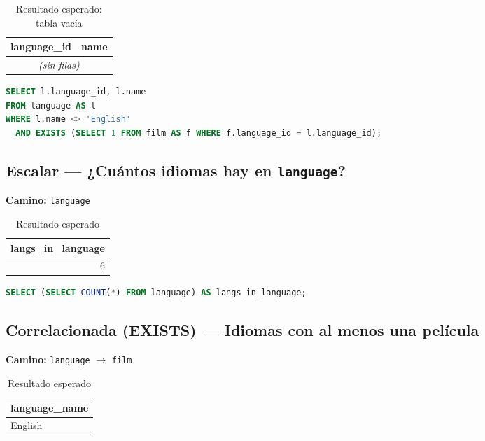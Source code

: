 \documentclass[12pt,a4paper]{article}
\begin{document}
\begin{table}[h]
\centering
\caption{Resultado esperado: tabla vacía}
\begin{tabular}{@{}r l@{}}
\toprule
\textbf{language\_id} & \textbf{name} \\
\midrule
\multicolumn{2}{c}{\emph{(sin filas)}} \\
\bottomrule
\end{tabular}
\end{table}

\begin{lstlisting}[language=SQL]
SELECT l.language_id, l.name
FROM language AS l
WHERE l.name <> 'English'
  AND EXISTS (SELECT 1 FROM film AS f WHERE f.language_id = l.language_id);
\end{lstlisting}

\subsection{Escalar — ¿Cuántos idiomas hay en \texttt{language}?}
\textbf{Camino:} \texttt{language}

\begin{table}[h]
\centering
\caption{Resultado esperado}
\begin{tabular}{@{}r@{}}
\toprule
\textbf{langs\_in\_language} \\
\midrule
6 \\
\bottomrule
\end{tabular}
\end{table}

\begin{lstlisting}[language=SQL]
SELECT (SELECT COUNT(*) FROM language) AS langs_in_language;
\end{lstlisting}

\subsection{Correlacionada (EXISTS) — Idiomas con al menos una película}
\textbf{Camino:} \texttt{language} $\rightarrow$ \texttt{film}

\begin{table}[h]
\centering
\caption{Resultado esperado}
\begin{tabular}{@{}l@{}}
\toprule
\textbf{language\_name} \\
\midrule
English \\
\bottomrule
\end{tabular}
\end{table}
\end{document}
